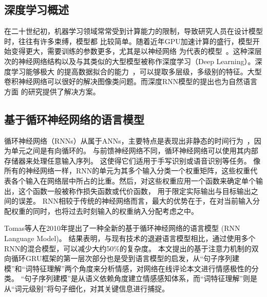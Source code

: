 \subsection{深度学习概述}
在二十世纪初，机器学习领域常常受到计算能力的限制，导致研究人员在设计模型时，往往有许多束缚，模型都
比较简单。随着近年GPU加速计算的盛行，模型开始变得更大，需要训练的参数更多，尤其是以神经网络
为代表的模型~。这种深层次的神经网络结构以及与其类似的大型模型被称作深度学习（Deep Learning）。深度学习能够极大
的提高数据拟合的能力~，可以提取多层级，多级别的特征。大型卷积神经网络可以很好的解决图像类问题。而深度RNN模型的提出也为自然语言方面
的研究提供了解决方案。


\subsection{基于循环神经网络的语言模型}
循环神经网络（RNNs）从属于ANNs，主要特点是表现出非静态的时间行为~，因为单元之间是有向循环的。
与前馈神经网络不同，循环神经网络可以使用其内部存储器来处理任意输入序列。
这使得它们适用于手写识别或语音识别等任务。
像所有的神经网络一样，RNN的单元为其多个输入分类一个权重矩阵，这些权重代表各个输入在网络层中所占的比重。然后，对这些权重应用一个函数来确定单个输出，这个函数一般被称作损失函数或代价函数，
用于限定实际输出与目标输出之间的误差。
RNN相较于传统的神经网络而言，最大的优势在于，在对当前输入分配权重的同时，也将过去时刻输入的权重纳入分配考虑之中。

Tomas等人在2010年提出了一种全新的基于循环神经网络的语言模型 (RNN Language Model)。
结果表明，与现有技术的退避语言模型相比，通过使用多个RNN的混合模型，可以减少大约50\%的复杂度。
本文提出的基于注意力机制的双向循环GRU框架的第一层次部分也是受到语言模型的启发，从“句子序列建模”和“词特征理解”两个角度来分析情感，对网络在线评论本文进行情感极性的分类。
“句子序列建模”是从语义依赖角度建立情感感知体系，而“词特征理解”则是从“词元级别”将句子细化，对其关键信息进行捕捉。

